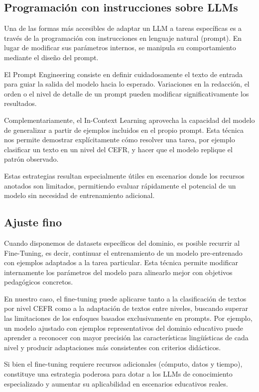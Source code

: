 \subsection{Programación con instrucciones sobre LLMs} \label{subsec:propmting}
Una de las formas más accesibles de adaptar un LLM a tareas específicas es a través de la programación con instrucciones en lenguaje natural (prompt). En lugar de modificar sus parámetros internos, se manipula su comportamiento mediante el diseño del prompt.

El Prompt Engineering consiste en definir cuidadosamente el texto de entrada para guiar la salida del modelo hacia lo esperado. Variaciones en la redacción, el orden o el nivel de detalle de un prompt pueden modificar significativamente los resultados.

Complementariamente, el In-Context Learning aprovecha la capacidad del modelo de generalizar a partir de ejemplos incluidos en el propio prompt. Esta técnica nos permite demostrar explícitamente cómo resolver una tarea, por ejemplo clasificar un texto en un nivel del CEFR,  y hacer que el modelo replique el patrón observado.

Estas estrategias resultan especialmente útiles en escenarios donde los recursos anotados son limitados, permitiendo evaluar rápidamente el potencial de un modelo sin necesidad de entrenamiento adicional.

\subsection{Ajuste fino} \label{subsec:finetuning}
Cuando disponemos de datasets específicos del dominio, es posible recurrir al Fine-Tuning, es decir, continuar el entrenamiento de un modelo pre-entrenado con ejemplos adaptados a la tarea particular. Esta técnica permite modificar internamente los parámetros del modelo para alinearlo mejor con objetivos pedagógicos concretos.

En nuestro caso, el fine-tuning puede aplicarse tanto a la clasificación de textos por nivel CEFR como a la adaptación de textos entre niveles, buscando superar las limitaciones de los enfoques basados exclusivamente en prompts. Por ejemplo, un modelo ajustado con ejemplos representativos del dominio educativo puede aprender a reconocer con mayor precisión las características lingüísticas de cada nivel y producir adaptaciones más consistentes con criterios didácticos.

Si bien el fine-tuning requiere recursos adicionales (cómputo, datos y tiempo), constituye una estrategia poderosa para dotar a los LLMs de conocimiento especializado y aumentar su aplicabilidad en escenarios educativos reales.
